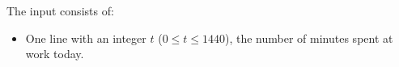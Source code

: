 
    The input consists of:
    \begin{itemize}
        \item One line with an integer $t$ ($0\leq t\leq 1440$), the number of minutes spent at work today.
    \end{itemize}
